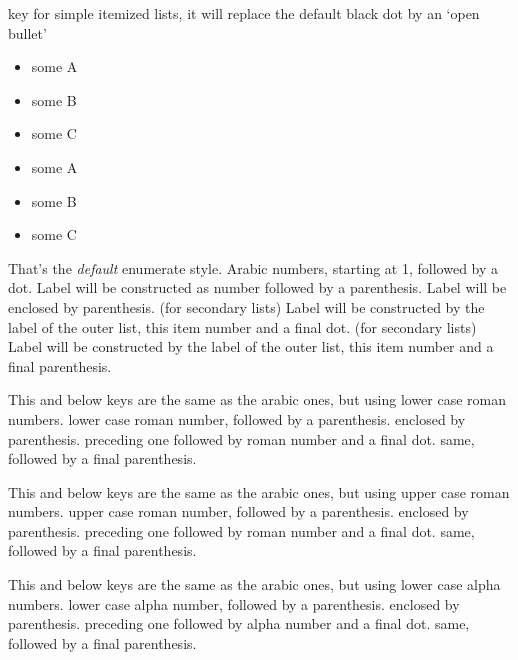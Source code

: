 \documentclass[article,nogeometry,english,tocdepth=3,secdepth=3]{ufrgscca} %
\begin{document}
\begin{describelist}{key}
	 { for simple itemized lists, it will replace the default black dot by an `open bullet'}

	\begin{codestore}[st=enumD]
	\begin{itemize}[tcc,miditemsep]
		\item some A
		\item some B
		\item some C
	\end{itemize}
	\begin{itemize}[tcc,bullet,miditemsep]
		\item some A
		\item some B
		\item some C
	\end{itemize}
\end{codestore}



	 { That's the \emph{default} enumerate style. Arabic numbers, starting at 1, followed by a dot.}
	 { Label will be constructed as number followed by a parenthesis.}
	 { Label will be enclosed by parenthesis.}
	 { (for secondary lists) Label will be constructed by the label of the outer list, this item number and a final dot.}
	 { (for secondary lists) Label will be constructed by the label of the outer list, this item number and a final parenthesis.}

	 { This and below keys are the same as the arabic ones, but using lower case roman numbers.}
	 { lower case roman number, followed by a parenthesis.}
	 { enclosed by parenthesis.}
	 { preceding one followed by roman number and a final dot.}
	 { same, followed by a final parenthesis.}

	 { This and below keys are the same as the arabic ones, but using upper case roman numbers.}
	 { upper case roman number, followed by a parenthesis.}
	 { enclosed by parenthesis.}
	 { preceding one followed by roman number and a final dot.}
	 { same, followed by a final parenthesis.}

	 { This and below keys are the same as the arabic ones, but using lower case alpha numbers.}
	 { lower case alpha number, followed by a parenthesis.}
	 { enclosed by parenthesis.}
	 { preceding one followed by alpha number and a final dot.}
	 { same, followed by a final parenthesis.}


\end{describelist}
\end{document}
